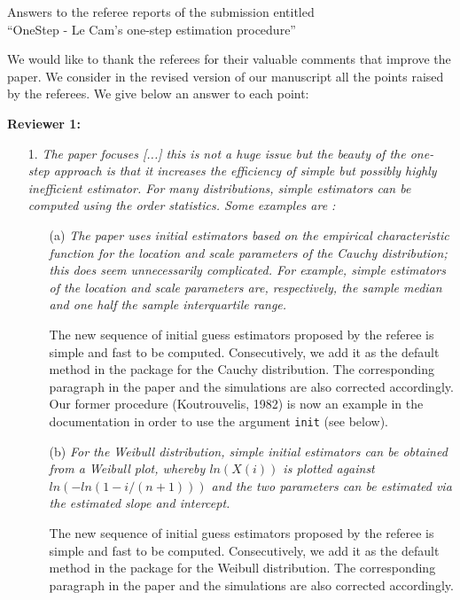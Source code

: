 \documentclass[11pt, a4paper]{article}
\begin{document}
 


\begin{center}
{\Large
Answers to the referee reports of the submission entitled\\ ``OneStep - Le Cam’s one-step estimation procedure''}
\end{center}

\vskip 48pt

We would like to thank the referees for their valuable comments that improve the paper. We consider in the revised version of our manuscript all the points raised by the referees. We give below an answer to each point:

\vskip 24pt

{\bf Reviewer 1:}

\begin{enumerate}
\item[1.]  {\it The paper focuses [...] this is not a huge issue but the beauty of the one-step approach is that it increases the efficiency of simple but possibly highly inefficient estimator. For many distributions, simple estimators can be computed using the order statistics. Some examples are :}

\begin{enumerate}
\item[(a)] {\it The paper uses initial estimators based on the empirical characteristic function for the location and scale parameters of the Cauchy distribution; this does seem unnecessarily complicated. For example, simple estimators of the location and scale parameters are, respectively, the sample median and one half the sample interquartile range.}

The new sequence of initial guess estimators proposed by the referee is simple and fast to be computed. Consecutively, we add it as the default method in the package for the Cauchy distribution. The corresponding paragraph in the paper and the simulations are also corrected accordingly. Our former procedure (Koutrouvelis, 1982) is now an example in the documentation 
in order to use the argument \texttt{init} (see below). 

\item[(b)] {\it For the Weibull distribution, simple initial estimators can be obtained from a Weibull plot, whereby $ln(X(i))$ is plotted against $ln(-ln(1-i/(n + 1)))$ and the two parameters can be estimated via the estimated slope and intercept.}

The new sequence of initial guess estimators proposed by the referee is simple and fast to be computed. Consecutively, we add it as the default method in the package for the Weibull distribution. The corresponding paragraph in the paper and the simulations are also corrected accordingly. 


\end{enumerate}
\end{enumerate}
\end{document}
